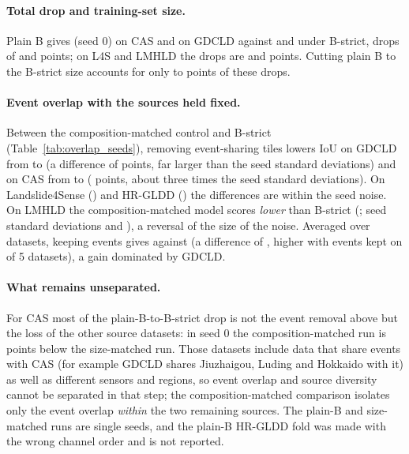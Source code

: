\documentclass[11pt]{article}
\newcommand{\iou}{IoU}
\begin{document}
\paragraph{Total drop and training-set size.} Plain B gives (seed 0) \PlainIouCasZ{} on CAS and \PlainIouGdcZ{} on GDCLD against \SegIouCasZ{} and \SegIouGdcZ{} under B-strict, drops of \OvlTotalCas{} and \OvlTotalGdc{} points; on L4S and LMHLD the drops are \OvlTotalLfs{} and \OvlTotalLmh{} points. Cutting plain B to the B-strict size accounts for only \OvlDataCas{} to \OvlDataGdc{} points of these drops.

\paragraph{Event overlap with the sources held fixed.} Between the composition-matched control and B-strict (Table~\ref{tab:overlap_seeds}), removing event-sharing tiles lowers \iou{} on GDCLD from \CompIouGdcP{} to \SegIouGdcP{} (a difference of \OvlEventsSeedsAbsGdc{} points, far larger than the seed standard deviations) and on CAS from \CompIouCasP{} to \SegIouCasP{} (\OvlEventsSeedsAbsCas{} points, about three times the seed standard deviations). On Landslide4Sense (\OvlEventsSeedsLfs{}) and HR-GLDD (\OvlEventsSeedsHrg{}) the differences are within the seed noise. On LMHLD the composition-matched model scores \emph{lower} than B-strict (\OvlEventsSeedsLmh{}; seed standard deviations \CompIouLmhS{} and \SegIouLmhS{}), a reversal of the size of the noise. Averaged over datasets, keeping events gives \CompIouAllP{} against \SegIouAllP{} (a difference of \OvlEventsSeedsMean{}, higher with events kept on \OvlEventsSeedsPos{} of 5 datasets), a gain dominated by GDCLD.

\paragraph{What remains unseparated.} For CAS most of the plain-B-to-B-strict drop is not the event removal above but the loss of the other source datasets: in seed 0 the composition-matched run is \OvlSourceCas{} points below the size-matched run. Those datasets include data that share events with CAS (for example GDCLD shares Jiuzhaigou, Luding and Hokkaido with it) as well as different sensors and regions, so event overlap and source diversity cannot be separated in that step; the composition-matched comparison isolates only the event overlap \emph{within} the two remaining sources. The plain-B and size-matched runs are single seeds, and the plain-B HR-GLDD fold was made with the wrong channel order and is not reported.
\end{document}
